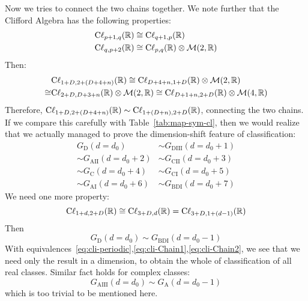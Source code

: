 \documentclass{article}
\begin{document}
Now we tries to connect the two chains together. We note further that the
Clifford Algebra has the following properties:
\begin{align}
    \mathrm{C\ell}_{p+1,q}(\mathbb{R}) &\cong \mathrm{C\ell}_{q+1,p}(\mathbb{R}) \\
    \mathrm{C\ell}_{q,p+2}(\mathbb{R}) &\cong \mathrm{C\ell}_{p,q}(\mathbb{R}) \otimes\mathcal{M}(2,\mathbb{R})
\end{align}
Then:
\begin{align}
    &\mathrm{C\ell}_{1+D,2+(D+4+n)}(\mathbb{R}) \cong
    \mathrm{C\ell}_{D+4+n,1+D}(\mathbb{R})\otimes\mathcal{M}(2,\mathbb{R}) \nonumber\\
    \cong& \mathrm{C\ell}_{2+D,D+3+n}(\mathbb{R})\otimes\mathcal{M}(2,\mathbb{R})
    \cong \mathrm{C\ell}_{D+1+n,2+D}(\mathbb{R})\otimes\mathcal{M}(4,\mathbb{R})
\end{align}
Therefore,
$\mathrm{C\ell}_{1+D,2+(D+4+n)}(\mathbb{R})\sim\mathrm{C\ell}_{1+(D+n),2+D}(\mathbb{R})$,
connecting the two chains. If we compare this carefully with
Table~\ref{tab:map-sym-cl}, then we would realize that we actually managed to
prove the dimension-shift feature of classification:
\begin{align}
    \label{eq:cli-Chain1}
    G_{\mathrm{D}}(d=d_0) &\sim G_{\mathrm{DIII}}(d=d_0+1) \nonumber\\
    \sim G_{\mathrm{AII}}(d=d_0+2) &\sim G_{\mathrm{CII}}(d=d_0+3) \nonumber\\
    \sim G_{\mathrm{C}}(d=d_0+4) &\sim G_{\mathrm{CI}}(d=d_0+5) \nonumber\\
    \sim G_{\mathrm{AI}}(d=d_0+6) &\sim G_{\mathrm{BDI}}(d=d_0+7)
\end{align}
We need one more property:
\begin{equation}
    \mathrm{C\ell}_{1+d,2+D}(\mathbb{R})\cong
    \mathrm{C\ell}_{3+D,d}(\mathbb{R})=\mathrm{C\ell}_{3+D,1+(d-1)}(\mathbb{R})
\end{equation}
Then
\begin{equation}
    \label{eq:cli-Chain2}
    G_{\mathrm{D}}(d=d_0) \sim G_{\mathrm{BDI}}(d=d_0-1)
\end{equation}
With equivalences~\ref{eq:cli-periodic},\ref{eq:cli-Chain1},\ref{eq:cli-Chain2},
we see that we need only the result in a dimension, to obtain the whole of
classification of all real classes. Similar fact holds for complex classes:
\begin{equation}
    G_{\mathrm{AIII}}(d=d_0) \sim G_{\mathrm{A}}(d=d_0-1)
\end{equation}
which is too trivial to be mentioned here. 
\end{document}
